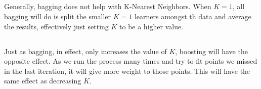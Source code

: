 \documentclass[12pt, oneside]{article}   	%
\begin{document}
\subsection{}

Generally, bagging does not help with K-Nearest Neighbors. When $K=1$, all bagging will do is split the smaller $K=1$ learners amongst th data and average the results, effectively just setting $K$ to be a higher value. 

\subsection{}

Just as bagging, in effect, only increases the value of $K$, boosting will have the opposite effect. As we run the process many times and try to fit points we missed in the last iteration, it will give more weight to those points. This will have the same effect as decreasing $K$. 
\end{document}
